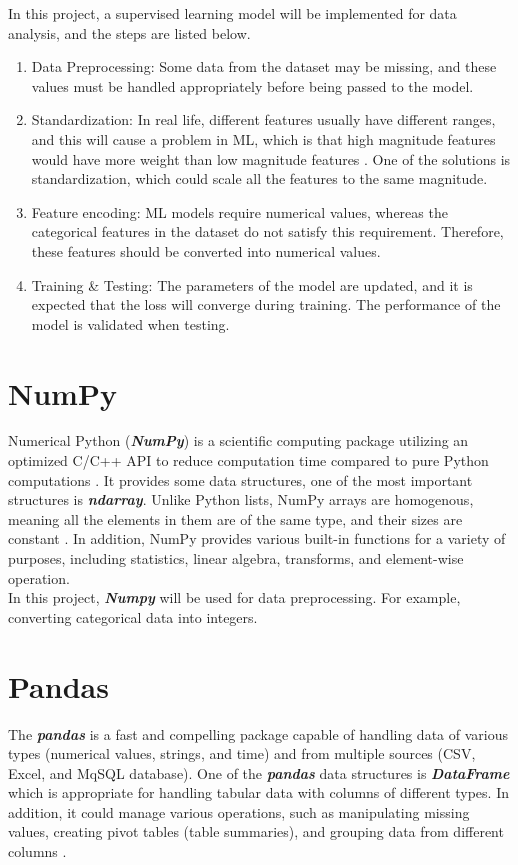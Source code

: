 \documentclass[12pt,twoside]{report}
\begin{document}
In this project, a supervised learning model will be implemented for data analysis, and the steps are listed below.
\begin{enumerate}
	\item Data Preprocessing: Some data from the dataset may be missing, and these values must be handled appropriately before being passed to the model. 
	\item Standardization: In real life, different features usually have different ranges, and this will cause a problem in ML, which is that high magnitude features would have more weight than low magnitude features \citep{RN4}. One of the solutions is standardization, which could scale all the features to the same magnitude.
	\item Feature encoding: ML models require numerical values, whereas the categorical features in the dataset do not satisfy this requirement. Therefore, these features should be converted into numerical values. 
	\item Training \& Testing: The parameters of the model are updated, and it is expected that the loss will converge during training. The performance of the model is validated when testing.
\end{enumerate}

\section{NumPy}
Numerical Python (\textit{\textbf{NumPy}}) is a scientific computing package utilizing an optimized C/C++ API to reduce computation time compared to pure Python computations \citep{RN6}. It provides some data structures, one of the most important structures is \textbf{\emph{ndarray}}. Unlike Python lists, NumPy arrays are homogenous, meaning all the elements in them are of the same type, and their sizes are constant \citep{RN4}.  In addition, NumPy provides various built-in functions for a variety of purposes, including statistics, linear algebra,  transforms, and element-wise operation. 
\\

In this project, \textit{\textbf{Numpy}} will be used for data preprocessing. For example, converting categorical data into integers.

\section{Pandas}
The \textbf{\textit{pandas}} is a fast and compelling package capable of handling data of various types (numerical values, strings, and time) and from multiple sources (CSV, Excel, and MqSQL database). One of the \textbf{\textit{pandas}} data structures is \textbf{\textit{DataFrame}} which is appropriate for handling tabular data with columns of different types. In addition, it could manage various operations, such as manipulating missing values, creating pivot tables (table summaries), and grouping data from different columns \citep{RN4}. 
\\
\end{document}
